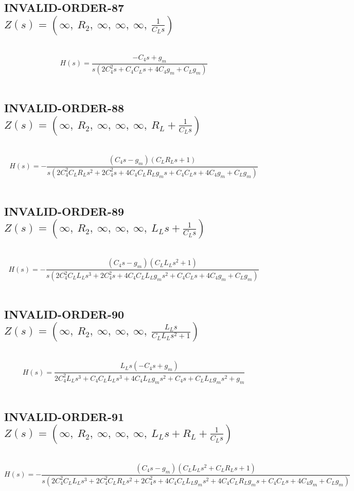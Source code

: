 \documentclass{article}
\begin{document}
\subsection{INVALID-ORDER-87 $Z(s) = \left( \infty, \  R_{2}, \  \infty, \  \infty, \  \infty, \  \frac{1}{C_{L} s}\right)$ } \ 
\textbf{\[H(s) = \frac{- C_{4} s + g_{m}}{s \left(2 C_{4}^{2} s + C_{4} C_{L} s + 4 C_{4} g_{m} + C_{L} g_{m}\right)}\] } \ 
\subsection{INVALID-ORDER-88 $Z(s) = \left( \infty, \  R_{2}, \  \infty, \  \infty, \  \infty, \  R_{L} + \frac{1}{C_{L} s}\right)$ } \ 
\textbf{\[H(s) = - \frac{\left(C_{4} s - g_{m}\right) \left(C_{L} R_{L} s + 1\right)}{s \left(2 C_{4}^{2} C_{L} R_{L} s^{2} + 2 C_{4}^{2} s + 4 C_{4} C_{L} R_{L} g_{m} s + C_{4} C_{L} s + 4 C_{4} g_{m} + C_{L} g_{m}\right)}\] } \ 
\subsection{INVALID-ORDER-89 $Z(s) = \left( \infty, \  R_{2}, \  \infty, \  \infty, \  \infty, \  L_{L} s + \frac{1}{C_{L} s}\right)$ } \ 
\textbf{\[H(s) = - \frac{\left(C_{4} s - g_{m}\right) \left(C_{L} L_{L} s^{2} + 1\right)}{s \left(2 C_{4}^{2} C_{L} L_{L} s^{3} + 2 C_{4}^{2} s + 4 C_{4} C_{L} L_{L} g_{m} s^{2} + C_{4} C_{L} s + 4 C_{4} g_{m} + C_{L} g_{m}\right)}\] } \ 
\subsection{INVALID-ORDER-90 $Z(s) = \left( \infty, \  R_{2}, \  \infty, \  \infty, \  \infty, \  \frac{L_{L} s}{C_{L} L_{L} s^{2} + 1}\right)$ } \ 
\textbf{\[H(s) = \frac{L_{L} s \left(- C_{4} s + g_{m}\right)}{2 C_{4}^{2} L_{L} s^{3} + C_{4} C_{L} L_{L} s^{3} + 4 C_{4} L_{L} g_{m} s^{2} + C_{4} s + C_{L} L_{L} g_{m} s^{2} + g_{m}}\] } \ 
\subsection{INVALID-ORDER-91 $Z(s) = \left( \infty, \  R_{2}, \  \infty, \  \infty, \  \infty, \  L_{L} s + R_{L} + \frac{1}{C_{L} s}\right)$ } \ 
\textbf{\[H(s) = - \frac{\left(C_{4} s - g_{m}\right) \left(C_{L} L_{L} s^{2} + C_{L} R_{L} s + 1\right)}{s \left(2 C_{4}^{2} C_{L} L_{L} s^{3} + 2 C_{4}^{2} C_{L} R_{L} s^{2} + 2 C_{4}^{2} s + 4 C_{4} C_{L} L_{L} g_{m} s^{2} + 4 C_{4} C_{L} R_{L} g_{m} s + C_{4} C_{L} s + 4 C_{4} g_{m} + C_{L} g_{m}\right)}\] } \ 
\end{document}
